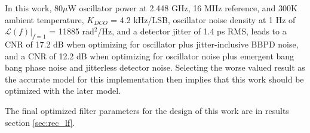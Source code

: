 	In this work, 80$\mu$W oscillator power at 2.448 GHz, 16 MHz reference, and 300K ambient temperature, $K_{DCO}$ = 4.2 kHz/LSB, oscillator noise density at 1 Hz of $\mathcal{L}(f)|_{f=1}$ = 11885 rad$^2$/Hz, and a detector jitter of 1.4 ps RMS, leads to a CNR of 17.2 dB when optimizing for oscillator plus jitter-inclusive BBPD noise, and a CNR of 12.2 dB when optimizing for oscillator noise plus emergent bang bang phase noise and jitterless detector noise. Selecting the worse valued result as the accurate model for this implementation then implies that this work should be optimized with the later model. 

	The final optimized filter parameters for the design of this work are in results section \ref{sec:rec_lf}.





	\FloatBarrier

